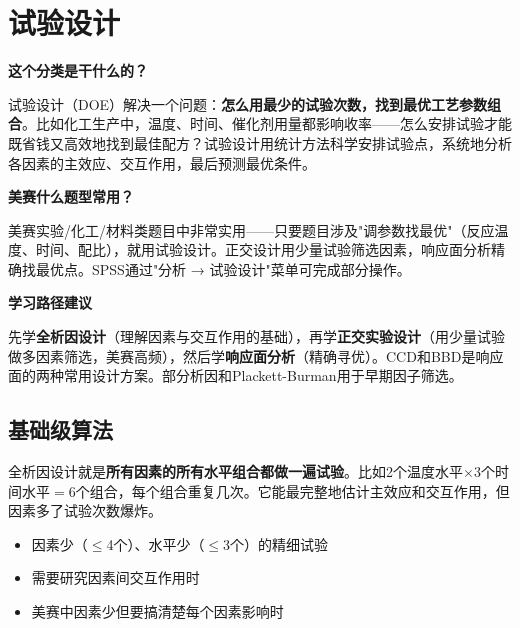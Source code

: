 \chapter{试验设计}

\begin{chapteroverview}
\textbf{这个分类是干什么的？}

试验设计（DOE）解决一个问题：\textbf{怎么用最少的试验次数，找到最优工艺参数组合}。比如化工生产中，温度、时间、催化剂用量都影响收率——怎么安排试验才能既省钱又高效地找到最佳配方？试验设计用统计方法科学安排试验点，系统地分析各因素的主效应、交互作用，最后预测最优条件。

\textbf{美赛什么题型常用？}

美赛实验/化工/材料类题目中非常实用——只要题目涉及"调参数找最优"（反应温度、时间、配比），就用试验设计。正交设计用少量试验筛选因素，响应面分析精确找最优点。SPSS通过"分析 → 试验设计"菜单可完成部分操作。

\textbf{学习路径建议}

先学\textbf{全析因设计}（理解因素与交互作用的基础），再学\textbf{正交实验设计}（用少量试验做多因素筛选，美赛高频），然后学\textbf{响应面分析}（精确寻优）。CCD和BBD是响应面的两种常用设计方案。部分析因和Plackett-Burman用于早期因子筛选。
\end{chapteroverview}

\section{基础级算法}


\begin{algointro}
全析因设计就是\textbf{所有因素的所有水平组合都做一遍试验}。比如2个温度水平$\times$3个时间水平$=$6个组合，每个组合重复几次。它能最完整地估计主效应和交互作用，但因素多了试验次数爆炸。
\end{algointro}

\begin{algoscene}
\begin{itemize}
    \item 因素少（$\leq$4个）、水平少（$\leq$3个）的精细试验
    \item 需要研究因素间交互作用时
    \item 美赛中因素少但要搞清楚每个因素影响时
\end{itemize}
\end{algoscene}

